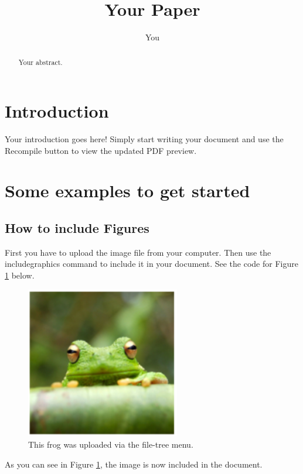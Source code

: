 \documentclass{article}
\title{Your Paper}
\author{You}
\begin{document}
\maketitle

\begin{abstract}
Your abstract.
\end{abstract}

\section{Introduction}

Your introduction goes here! Simply start writing your document and use the Recompile button to view the updated PDF preview.

\section{Some examples to get started}

\subsection{How to include Figures}

First you have to upload the image file from your computer. Then use the includegraphics command to include it in your document. See the code for Figure \ref{fig:frog} below.

\begin{figure}[h]
  \centering
  \includegraphics[width=0.6\textwidth]{frog.png}
  \caption{This frog was uploaded via the file-tree menu.}
  \label{fig:frog}
\end{figure}

As you can see in Figure \ref{fig:frog}, the image is now included in the document.
\end{document}
